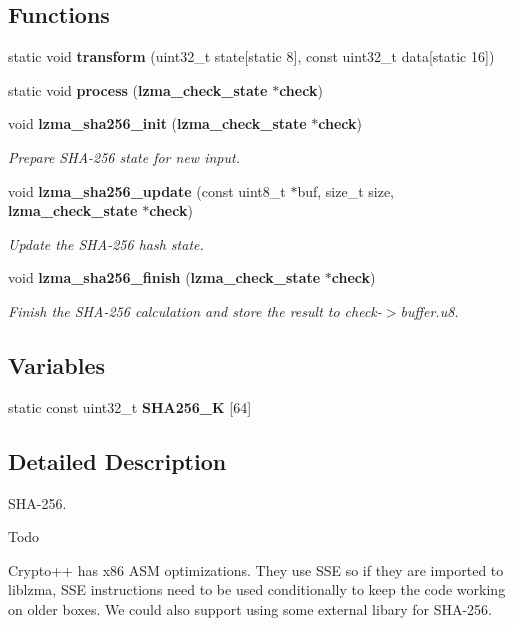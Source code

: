 \subsection*{Functions}
\begin{DoxyCompactItemize}
\item 
static void {\bfseries transform} (uint32\-\_\-t state[static 8], const uint32\-\_\-t data[static 16])\label{sha256_8c_aab742c9379fbbf2e38dcfb29723dbe74}

\item 
static void {\bfseries process} ({\bf lzma\-\_\-check\-\_\-state} $\ast${\bf check})\label{sha256_8c_a1a3c107d249ff7adedee1b0d94557500}

\item 
void {\bf lzma\-\_\-sha256\-\_\-init} ({\bf lzma\-\_\-check\-\_\-state} $\ast${\bf check})
\begin{DoxyCompactList}\small\item\em Prepare S\-H\-A-\/256 state for new input. \end{DoxyCompactList}\item 
void {\bf lzma\-\_\-sha256\-\_\-update} (const uint8\-\_\-t $\ast$buf, size\-\_\-t size, {\bf lzma\-\_\-check\-\_\-state} $\ast${\bf check})
\begin{DoxyCompactList}\small\item\em Update the S\-H\-A-\/256 hash state. \end{DoxyCompactList}\item 
void {\bf lzma\-\_\-sha256\-\_\-finish} ({\bf lzma\-\_\-check\-\_\-state} $\ast${\bf check})
\begin{DoxyCompactList}\small\item\em Finish the S\-H\-A-\/256 calculation and store the result to check-\/$>$buffer.\-u8. \end{DoxyCompactList}\end{DoxyCompactItemize}
\subsection*{Variables}
\begin{DoxyCompactItemize}
\item 
static const uint32\-\_\-t {\bfseries S\-H\-A256\-\_\-\-K} [64]
\end{DoxyCompactItemize}


\subsection{Detailed Description}
S\-H\-A-\/256. \begin{DoxyRefDesc}{Todo}
\item[{\bf Todo}]Crypto++ has x86 A\-S\-M optimizations. They use S\-S\-E so if they are imported to liblzma, S\-S\-E instructions need to be used conditionally to keep the code working on older boxes. We could also support using some external libary for S\-H\-A-\/256. \end{DoxyRefDesc}


